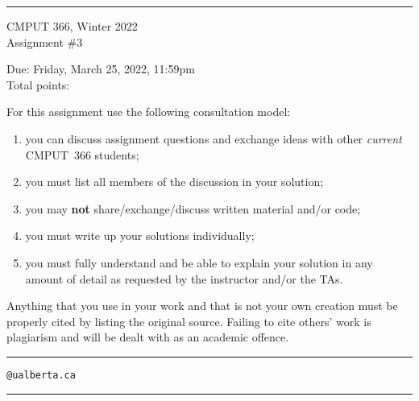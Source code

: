 \documentclass{article}
\newcounter{totalpoints}
\begin{document}
{\bigskip\hrule\bigskip
\huge
\noindent CMPUT 366, Winter 2022\\
Assignment \#3

\large
Due: Friday, March 25, 2022, 11:59pm\\
Total points: 

For this assignment use the following consultation model:
\begin{enumerate}

\item you can discuss assignment questions and exchange ideas with other \emph{current} CMPUT~366 students;

\item you must list all members of the discussion in your solution;

\item you may {\bf not} share/exchange/discuss written material and/or code;

\item you must write up your solutions individually;

\item you must fully understand and be able to explain your solution in any amount of detail as requested by the instructor and/or the TAs.

\end{enumerate}

Anything that you use in your work and that is not your own creation must be properly cited by listing the original source. Failing to cite others' work is plagiarism and will be dealt with as an academic offence.


\bigskip\bigskip\hrule\bigskip

\vspace{1cm}
\hspace{1cm}{\bf First name:} \underline{\hspace{7cm}}

\vspace{1cm}
\hspace{1cm}{\bf Last name:} \underline{\hspace{7cm}}

\vspace{1cm}
\hspace{1cm}{\bf CCID:} \underline{\hspace{5.5cm}}\verb|@ualberta.ca|

\vspace{1cm}
\hspace{1cm}{\bf Collaborators:} \underline{\hspace{6.5cm}}

\vspace{1cm}
\bigskip\hrule\bigskip
}
\end{document}
